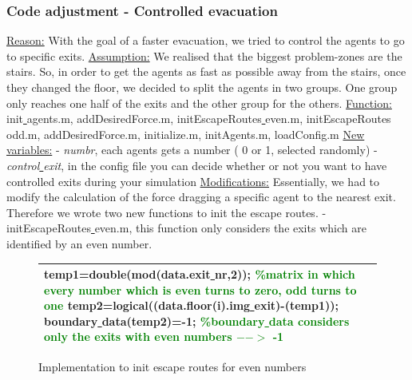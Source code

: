 \documentclass[11pt]{article}
\begin{document}
\subsubsection{Code adjustment - Controlled evacuation}

\underline{Reason:}
\newline
With the goal of a faster evacuation, we tried to control the agents to go to specific exits. 
\newline
\underline{Assumption:}
\newline
We realised that the biggest problem-zones are the stairs. So, in order to get the agents as fast as possible away from the stairs, once they changed the floor, we decided to split the agents in two groups. 
One group only reaches one half of the exits and the other group for the others. 
\newline
\underline{Function:}
\newline
init\underline{ }agents.m, addDesiredForce.m, initEscapeRoutes\underline{ }even.m, initEscapeRoutes\underline{ }odd.m, addDesiredForce.m, initialize.m, initAgents.m, loadConfig.m
\newline
\underline{New variables:}
\newline 
- \textit{numbr}, each agents gets a number ( 0 or 1, selected randomly)
\newline
- \textit{control\underline{ }exit}, in the config file you can decide whether or not you want to have controlled exits during your simulation
\newline
\underline{Modifications:}
\newline
Essentially, we had to modify the calculation of the force dragging a specific agent to the nearest exit.  Therefore we wrote two new functions to init the escape routes. 
\newline
- initEscapeRoutes\underline{ }even.m, this function only considers the exits  which are identified by an even number.

\begin{figure}[H]
\centering
\begin{tabular}
{|>{\large}m{\textwidth}|} \hline
\bigskip
temp1=double(mod(data.exit\underline{ }nr,2)); \textcolor{green}{\%matrix in which every number which is even turns to zero, odd turns to one}
\newline
temp2=logical((data.floor(i).img\underline{ }exit)-(temp1));
\newline
boundary\underline{ }data(temp2)=-1; \textcolor{green}{\%boundary\underline{ }data considers only the exits with even numbers $-->$ -1 }
\bigskip
\\ \hline
\end{tabular}
\caption{Implementation to init escape routes for even numbers}
\end{figure}
\end{document}
